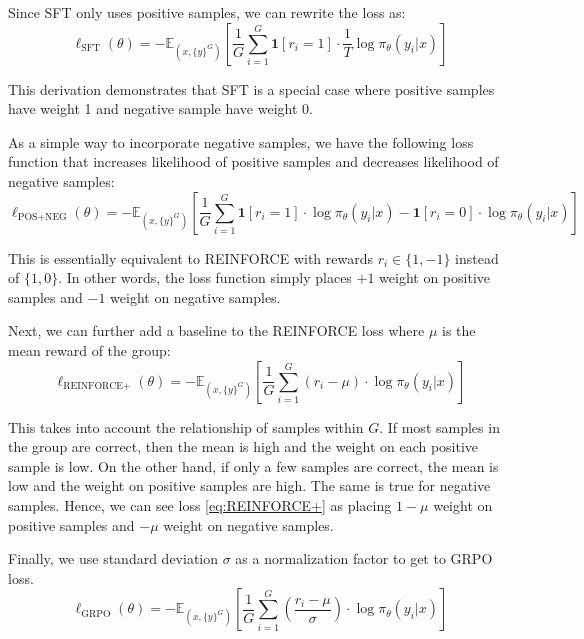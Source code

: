 \documentclass[12pt]{cmuthesis}
\begin{document}
Since SFT only uses positive samples, we can rewrite the loss as:
\begin{equation}
    \ell_{\text{SFT}}(\theta) = - \mathbb{E}_{(x, \{y\}^G)} \left[ \frac{1}{G} \sum_{i = 1}^G \boldsymbol{1}[r_i = 1] \cdot \frac{1}{T} \log \pi_\theta(y_i \vert x) \right]
    \label{eq:SFT}
\end{equation}

This derivation demonstrates that SFT is a special case where positive samples have weight 1 and negative sample have weight 0.

As a simple way to incorporate negative samples, we have the following loss function that increases likelihood of positive samples and decreases likelihood of negative samples:
\begin{equation}
    \ell_{\text{POS+NEG}}(\theta) = - \mathbb{E}_{(x, \{y\}^G)} \left[ \frac{1}{G} \sum_{i = 1}^G \boldsymbol{1}[r_i = 1] \cdot \log \pi_\theta(y_i \vert x) - \boldsymbol{1}[r_i = 0] \cdot \log \pi_\theta(y_i \vert x) \right]
    \label{eq:POS+NEG}
\end{equation}

This is essentially equivalent to REINFORCE \citep{williamsSimple1992} with rewards $r_i \in \{1, -1\}$ instead of $\{1, 0\}$. In other words, the loss function simply places $+1$ weight on positive samples and $-1$ weight on negative samples.

Next, we can further add a baseline to the REINFORCE loss where $\mu$ is the mean reward of the group:
\begin{equation}
    \ell_{\text{REINFORCE+}}(\theta) = - \mathbb{E}_{(x, \{y\}^G)} \left[ \frac{1}{G} \sum_{i = 1}^G (r_i - \mu) \cdot \log \pi_\theta(y_i \vert x) \right]
    \label{eq:REINFORCE+}
\end{equation}

This takes into account the relationship of samples within $G$. If most samples in the group are correct, then the mean is high and the weight on each positive sample is low. On the other hand, if only a few samples are correct, the mean is low and the weight on positive samples are high. The same is true for negative samples. Hence, we can see loss \ref{eq:REINFORCE+} as placing $1- \mu$ weight on positive samples and $-\mu$ weight on negative samples.


Finally, we use standard deviation $\sigma$ as a normalization factor to get to GRPO loss.
\begin{equation}
    \ell_{\text{GRPO}}(\theta) = - \mathbb{E}_{(x, \{y\}^G)} \left[ \frac{1}{G} \sum_{i = 1}^G \left( \frac{r_i - \mu}{\sigma} \right) \cdot \log \pi_\theta(y_i \vert x) \right]
    \label{eq:GRPO}
\end{equation}
\end{document}
